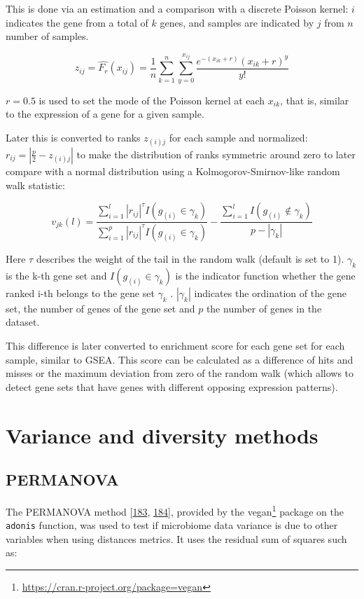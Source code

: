 \documentclass[
  12pt,
  a4paper,
  twoside,
  openright]{book}
\DeclareRobustCommand{\href}[2]{#2\footnote{\url{#1}}}
\begin{document}
This is done via an estimation and a comparison with a discrete Poisson kernel: \(i\) indicates the gene from a total of \(k\) genes, and samples are indicated by \(j\) from \(n\) number of samples.

\[
z_{ij}=\hat{F_r}(x_{ij}) = \frac{1}{n}\sum_{k=1}^n\sum_{y=0}^{x_{ij}}\dfrac{e^{-(x_{ik}+r)}(x_{ik} + r)^y }{y!}
\]

\(r = 0.5\) is used to set the mode of the Poisson kernel at each \(x_{ik}\), that is, similar to the expression of a gene for a given sample.

Later this is converted to ranks \(z_{(i)j}\) for each sample and normalized: \(r_{ij}=|\frac{p}{2}-z_{(i)j}|\) to make the distribution of ranks symmetric around zero to later compare with a normal distribution using a Kolmogorov-Smirnov-like random walk statistic:

\[
v_{jk}(l)=\dfrac{\sum_{i=1}^l|r_{ij}|^{\tau}I(g_{(i)}\in \gamma_k)}{\sum_{i=1}^p|r_{ij}|^{\tau}I(g_{(i)} \in \gamma_k)}
- \dfrac{\sum_{i=1}^lI(g_{(i)} \not \in\gamma_k)}{p-|\gamma_k|}
\]

Here \(\tau\) describes the weight of the tail in the random walk (default is set to 1).
\(\gamma_k\) is the k-th gene set and \(I(g_{(i)}\in \gamma_k)\) is the indicator function whether the gene ranked i-th belongs to the gene set \(\gamma_k\) .
\(|\gamma_k|\) indicates the ordination of the gene set, the number of genes of the gene set and \(p\) the number of genes in the dataset.

This difference is later converted to enrichment score for each gene set for each sample, similar to GSEA.
This score can be calculated as a difference of hits and misses or the maximum deviation from zero of the random walk (which allows to detect gene sets that have genes with different opposing expression patterns).

\hypertarget{variance}{%
\section{Variance and diversity methods}\label{variance}}

\hypertarget{permanova}{%
\subsection{PERMANOVA}\label{permanova}}

The PERMANOVA method {[}\protect\hyperlink{ref-anderson2001}{183}, \protect\hyperlink{ref-warton2012}{184}{]}, provided by the \href{https://cran.r-project.org/package=vegan}{vegan} package on the \texttt{adonis} function, was used to test if microbiome data variance is due to other variables when using distances metrics.
It uses the residual sum of squares such as:
\end{document}
